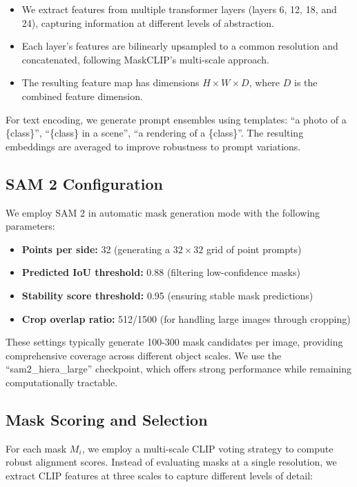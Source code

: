 \begin{itemize}
    \item We extract features from multiple transformer layers (layers 6, 12, 18, and 24), capturing information at different levels of abstraction.
    \item Each layer's features are bilinearly upsampled to a common resolution and concatenated, following MaskCLIP's multi-scale approach.
    \item The resulting feature map has dimensions $H \times W \times D$, where $D$ is the combined feature dimension.
\end{itemize}

For text encoding, we generate prompt ensembles using templates: ``a photo of a \{class\}'', ``\{class\} in a scene'', ``a rendering of a \{class\}''. The resulting embeddings are averaged to improve robustness to prompt variations.

\subsection{SAM 2 Configuration}

We employ SAM 2 in automatic mask generation mode with the following parameters:

\begin{itemize}
    \item \textbf{Points per side:} 32 (generating a $32 \times 32$ grid of point prompts)
    \item \textbf{Predicted IoU threshold:} 0.88 (filtering low-confidence masks)
    \item \textbf{Stability score threshold:} 0.95 (ensuring stable mask predictions)
    \item \textbf{Crop overlap ratio:} 512/1500 (for handling large images through cropping)
\end{itemize}

These settings typically generate 100-300 mask candidates per image, providing comprehensive coverage across different object scales. We use the ``sam2\_hiera\_large'' checkpoint, which offers strong performance while remaining computationally tractable.

\subsection{Mask Scoring and Selection}

For each mask $M_i$, we employ a multi-scale CLIP voting strategy to compute robust alignment scores. Instead of evaluating masks at a single resolution, we extract CLIP features at three scales to capture different levels of detail:

